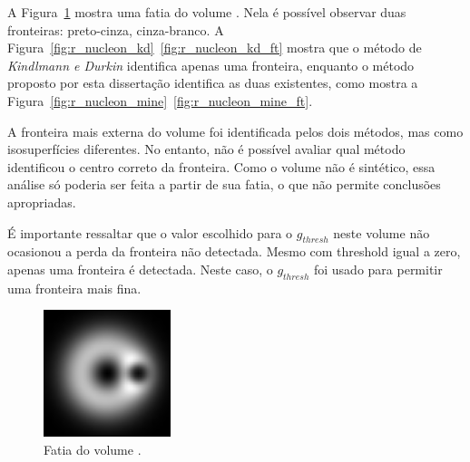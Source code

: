 \newpage
	A Figura~\ref{fig:r_nucleon_slice} mostra uma fatia do volume . Nela é possível observar duas fronteiras: preto-cinza, cinza-branco. A Figura~\ref{fig:r_nucleon_kd}~\ref{fig:r_nucleon_kd_ft} mostra que o método de \textit{Kindlmann e Durkin} identifica apenas uma fronteira, enquanto o método proposto por esta dissertação identifica as duas existentes, como mostra a Figura~\ref{fig:r_nucleon_mine}~\ref{fig:r_nucleon_mine_ft}.
	
	A fronteira mais externa do volume foi identificada pelos dois métodos, mas como isosuperfícies diferentes. No entanto, não é possível avaliar qual método identificou o centro correto da fronteira. Como o volume não é sintético, essa análise só poderia ser feita a partir de sua fatia, o que não permite conclusões apropriadas.
	
	É importante ressaltar que o valor escolhido para o $ g_{thresh} $ neste volume não ocasionou a perda da fronteira não detectada. Mesmo com threshold igual a zero, apenas uma fronteira é detectada. Neste caso, o $ g_{thresh} $ foi usado para permitir uma fronteira mais fina.
	
\begin{figure}[h]
	\centering
	\includegraphics[width=0.33\textwidth]{images/g_nucleon_slice}
	\caption{Fatia do volume .}
	\label{fig:r_nucleon_slice}
\end{figure}

